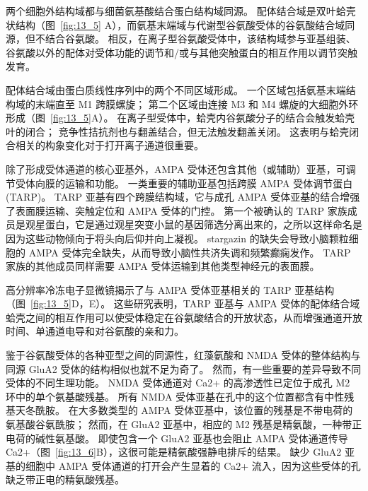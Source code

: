 两个细胞外结构域都与细菌氨基酸结合蛋白结构域同源。 配体结合域是双叶蛤壳状结构（图~\ref{fig:13_5} A），而氨基末端域与代谢型谷氨酸受体的谷氨酸结合域同源，但不结合谷氨酸。
相反，在离子型谷氨酸受体中，该结构域参与亚基组装、谷氨酸以外的配体对受体功能的调节和/或与其他突触蛋白的相互作用以调节突触发育。


配体结合域由蛋白质线性序列中的两个不同区域形成。
一个区域包括氨基末端结构域的末端直至 M1 跨膜螺旋；
第二个区域由连接 M3 和 M4 螺旋的大细胞外环形成（图~\ref{fig:13_5}A）。
在离子型受体中，蛤壳内谷氨酸分子的结合会触发蛤壳叶的闭合；
竞争性拮抗剂也与翻盖结合，但无法触发翻盖关闭。
这表明与蛤壳闭合相关的构象变化对于打开离子通道很重要。


除了形成受体通道的核心亚基外，AMPA 受体还包含其他（或辅助）亚基，可调节受体向膜的运输和功能。
一类重要的辅助亚基包括跨膜 AMPA 受体调节蛋白 (TARP)。
TARP 亚基有四个跨膜结构域，它与成孔 AMPA 受体亚基的结合增强了表面膜运输、突触定位和 AMPA 受体的门控。
第一个被确认的 TARP 家族成员是观星蛋白，它是通过观星突变小鼠的基因筛选分离出来的，之所以这样命名是因为这些动物倾向于将头向后仰并向上凝视。
stargazin 的缺失会导致小脑颗粒细胞的 AMPA 受体完全缺失，从而导致小脑性共济失调和频繁癫痫发作。
TARP 家族的其他成员同样需要 AMPA 受体运输到其他类型神经元的表面膜。


高分辨率冷冻电子显微镜揭示了与 AMPA 受体亚基相关的 TARP 亚基结构（图~\ref{fig:13_5}D，E）。
这些研究表明，TARP 亚基与 AMPA 受体的配体结合域蛤壳之间的相互作用可以使受体稳定在谷氨酸结合的开放状态，从而增强通道开放时间、单通道电导和对谷氨酸的亲和力。


鉴于谷氨酸受体的各种亚型之间的同源性，红藻氨酸和 NMDA 受体的整体结构与同源 GluA2 受体的结构相似也就不足为奇了。
然而，有一些重要的差异导致不同受体的不同生理功能。 
NMDA 受体通道对 Ca2+ 的高渗透性已定位于成孔 M2 环中的单个氨基酸残基。
所有 NMDA 受体亚基在孔中的这个位置都含有中性残基天冬酰胺。
在大多数类型的 AMPA 受体亚基中，该位置的残基是不带电荷的氨基酸谷氨酰胺；
然而，在 GluA2 亚基中，相应的 M2 残基是精氨酸，一种带正电荷的碱性氨基酸。
即使包含一个 GluA2 亚基也会阻止 AMPA 受体通道传导 Ca2+（图~\ref{fig:13_6}B），这很可能是精氨酸强静电排斥的结果。
缺少 GluA2 亚基的细胞中 AMPA 受体通道的打开会产生显着的 Ca2+ 流入，因为这些受体的孔缺乏带正电的精氨酸残基。


